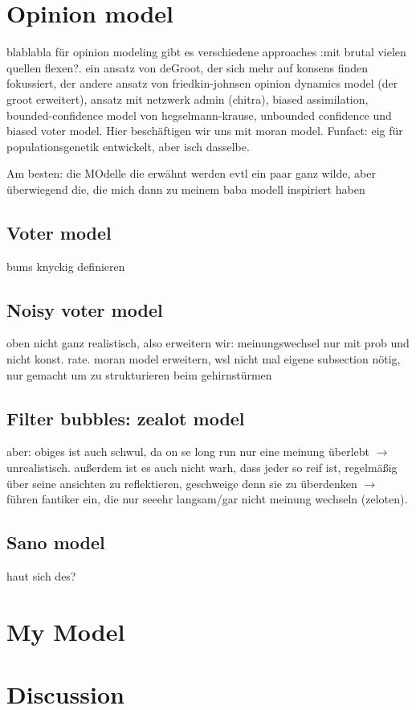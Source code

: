 \documentclass[12pt,a4paper,twoside]{article}
\begin{document}
\section{Opinion model}
blablabla für opinion modeling gibt es verschiedene approaches :mit brutal vielen quellen flexen?. ein ansatz von deGroot, der sich mehr auf konsens finden fokussiert, der andere ansatz von friedkin-johnsen opinion dynamics model (der groot erweitert), ansatz mit netzwerk admin (chitra), biased assimilation, bounded-confidence model von hegselmann-krause, unbounded confidence und biased voter model. Hier beschäftigen wir uns mit moran model. Funfact: eig für populationsgenetik entwickelt, aber isch dasselbe.

Am besten: die MOdelle die erwähnt werden evtl ein paar ganz wilde, aber überwiegend die, die mich dann zu meinem baba modell inspiriert haben
\subsection{Voter model}
bums knyckig definieren
\subsection{Noisy voter model}
oben nicht ganz realistisch, also erweitern wir: meinungswechsel nur mit prob und nicht konst. rate.
moran model erweitern, wsl nicht mal eigene subsection nötig, nur gemacht um zu strukturieren beim gehirnstürmen
\subsection{Filter bubbles: zealot model}
aber: obiges ist auch schwul, da on se long run nur eine meinung überlebt $\rightarrow$ unrealistisch. außerdem ist es auch nicht warh, dass jeder so reif ist, regelmäßig über seine ansichten zu reflektieren, geschweige denn sie zu überdenken $\rightarrow$ führen fantiker ein, die nur seeehr langsam/gar nicht meinung wechseln (zeloten).
\subsection{Sano model}
haut sich des? %
\section{My Model}
\section{Discussion}

\newpage
\printbibliography
\end{document}
